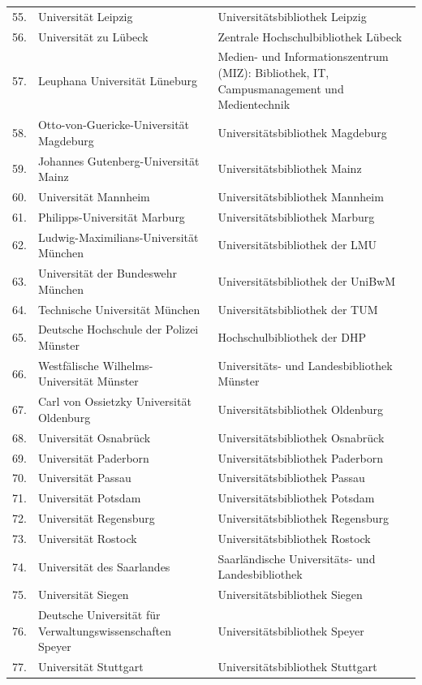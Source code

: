 \documentclass[a4paper,
fontsize=11pt,
oneside,
numbers=noperiodatend,
parskip=half-,
bibliography=totoc,
final
]{scrartcl}
\begin{document}
\begin{longtable}[l]{rp{7cm}p{7.5cm}}
55. & Universität Leipzig & Universitätsbibliothek Leipzig \\
56. & Universität zu Lübeck & Zentrale Hochschulbibliothek Lübeck \\
57. & Leuphana Universität Lüneburg & Medien- und Informationszentrum (MIZ): Bibliothek, IT, Campusmanagement und Medientechnik \\
58. & Otto-von-Guericke-Universität Magdeburg & Universitätsbibliothek Magdeburg \\
59. & Johannes Gutenberg-Universität Mainz & Universitätsbibliothek Mainz \\
60. & Universität Mannheim & Universitätsbibliothek Mannheim \\
61. & Philipps-Universität Marburg & Universitätsbibliothek Marburg \\
62. & Ludwig-Maximilians-Universität München & Universitätsbibliothek der LMU \\
63. & Universität der Bundeswehr München & Universitätsbibliothek der UniBwM \\
64. & Technische Universität München & Universitätsbibliothek der TUM \\
65. & Deutsche Hochschule der Polizei Münster & Hochschulbibliothek der DHP \\
66. & Westfälische Wilhelms-Universität Münster & Universitäts- und Landesbibliothek Münster \\
67. & Carl von Ossietzky Universität Oldenburg & Universitätsbibliothek Oldenburg \\
68. & Universität Osnabrück & Universitätsbibliothek Osnabrück \\
69. & Universität Paderborn & Universitätsbibliothek Paderborn \\
70. & Universität Passau & Universitätsbibliothek Passau \\
71. & Universität Potsdam & Universitätsbibliothek Potsdam \\
72. & Universität Regensburg & Universitätsbibliothek Regensburg \\
73. & Universität Rostock & Universitätsbibliothek Rostock \\
74. & Universität des Saarlandes & Saarländische Universitäts- und Landesbibliothek \\
75. & Universität Siegen & Universitätsbibliothek Siegen \\
76. & Deutsche Universität für Verwaltungswissenschaften Speyer & Universitätsbibliothek Speyer \\
77. & Universität Stuttgart & Universitätsbibliothek Stuttgart \\

\end{longtable}
\end{document}
